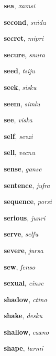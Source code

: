 \documentclass[12pt]{book}
\begin{document}
\begin{description}
\item[ ] \textbf{sea}, \textit{xamsi}

\item[ ] \textbf{second}, \textit{snidu}

\item[ ] \textbf{secret}, \textit{mipri}

\item[ ] \textbf{secure}, \textit{snura}

\item[ ] \textbf{seed}, \textit{tsiju}

\item[ ] \textbf{seek}, \textit{sisku}

\item[ ] \textbf{seem}, \textit{simlu}

\item[ ] \textbf{see}, \textit{viska}

\item[ ] \textbf{self}, \textit{sevzi}

\item[ ] \textbf{sell}, \textit{vecnu}

\item[ ] \textbf{sense}, \textit{ganse}

\item[ ] \textbf{sentence}, \textit{jufra}

\item[ ] \textbf{sequence}, \textit{porsi}

\item[ ] \textbf{serious}, \textit{junri}

\item[ ] \textbf{serve}, \textit{selfu}

\item[ ] \textbf{severe}, \textit{jursa}

\item[ ] \textbf{sew}, \textit{fenso}

\item[ ] \textbf{sexual}, \textit{cinse}

\item[ ] \textbf{shadow}, \textit{ctino}

\item[ ] \textbf{shake}, \textit{desku}

\item[ ] \textbf{shallow}, \textit{caxno}

\item[ ] \textbf{shape}, \textit{tarmi}


\end{description}
\end{document}
